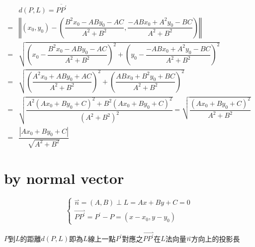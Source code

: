 \documentclass[
]{book}
\theoremstyle{definition}
\theoremstyle{definition}
\theoremstyle{definition}
\theoremstyle{definition}
\theoremstyle{remark}
\begin{document}
\[
\begin{aligned}
 & d\left(P,L\right)=\overline{PP^{\prime}}\\
= & \left\Vert \left(x_{0},y_{0}\right)-\left(\dfrac{B^{2}x_{0}-ABy_{0}-AC}{A^{2}+B^{2}},\dfrac{-ABx_{0}+A^{2}y_{0}-BC}{A^{2}+B^{2}}\right)\right\Vert \\
= & \sqrt{\left(x_{0}-\dfrac{B^{2}x_{0}-ABy_{0}-AC}{A^{2}+B^{2}}\right)^{2}+\left(y_{0}-\dfrac{-ABx_{0}+A^{2}y_{0}-BC}{A^{2}+B^{2}}\right)^{2}}\\
= & \sqrt{\left(\dfrac{A^{2}x_{0}+ABy_{0}+AC}{A^{2}+B^{2}}\right)^{2}+\left(\dfrac{ABx_{0}+B^{2}y_{0}+BC}{A^{2}+B^{2}}\right)^{2}}\\
= & \sqrt{\dfrac{A^{2}\left(Ax_{0}+By_{0}+C\right)^{2}+B^{2}\left(Ax_{0}+By_{0}+C\right)^{2}}{\left(A^{2}+B^{2}\right)^{2}}}=\sqrt{\dfrac{\left(Ax_{0}+By_{0}+C\right)^{2}}{A^{2}+B^{2}}}\\
= & \dfrac{\left|Ax_{0}+By_{0}+C\right|}{\sqrt{A^{2}+B^{2}}}
\end{aligned}
\]

\hypertarget{by-normal-vector}{%
\section{by normal vector}\label{by-normal-vector}}

\[
\begin{cases}
\overset{\rightharpoonup}{n}=\left(A,B\right)\perp L=Ax+By+C=0\\
\overset{\rightharpoonup}{PP^{\prime}}=P^{\prime}-P=\left(x-x_{0},y-y_{0}\right)
\end{cases}
\]

\begin{CJK}{UTF8}{bsmi}
$P$到$L$的距離$d\left(P,L\right)$即為$L$線上一點$P^{\prime}$對應之$\overset{\rightharpoonup}{PP^{\prime}}$在$L$法向量$\overset{\rightharpoonup}{n}$方向上的投影長
\end{CJK}
\end{document}
